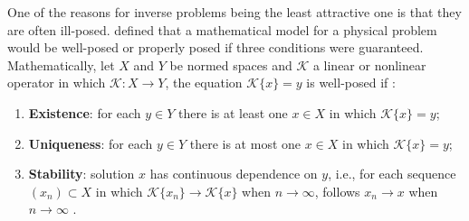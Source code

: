 		One of the reasons for inverse problems being the least attractive one is that they are often ill-posed. \cite{hadamard1923lectures} defined that a mathematical model for a physical problem would be well-posed or properly posed if three conditions were guaranteed. Mathematically, let $X$ and $Y$ be normed spaces and $\mathcal{K}$ a linear or nonlinear operator in which $\mathcal{K} : X \rightarrow Y$, the equation $\mathcal{K}\{x\}=y$ is well-posed if \citep{kirsch2011introduction}:
		\begin{enumerate}
			\item \textbf{Existence}: for each $y\in Y$ there is at least one $x\in X$ in which $\mathcal{K}\{x\}=y$;
			\item \textbf{Uniqueness}: for each $y\in Y$ there is at most one $x\in X$ in which $\mathcal{K}\{x\}=y$;
			\item \textbf{Stability}: solution $x$ has continuous dependence on $y$, i.e., for each sequence $(x_n)\subset X$ in which $\mathcal{K}\{x_n\}\rightarrow \mathcal{K}\{x\}$ when  $n\rightarrow\infty$, follows $x_n\rightarrow x$ when $n\rightarrow\infty$ .
		\end{enumerate}
	
